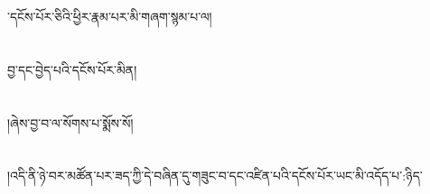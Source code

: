 ་དངོས་པོར་ཅིའི་ཕྱིར་རྣམ་པར་མི་གཞག་སྙམ་པ་ལ།\chapter{ }བྱ་དང་བྱེད་པའི་དངོས་པོར་མིན།\chapter{ }།ཞེས་བྱ་བ་ལ་སོགས་པ་སྨོས་སོ།\chapter{ }།འདི་ནི་ཉེ་བར་མཚོན་པར་ཟད་ཀྱི་དེ་བཞིན་དུ་གཟུང་བ་དང་འཛིན་པའི་དངོས་པོར་ཡང་མི་འདོད་པ་:ཉིད་